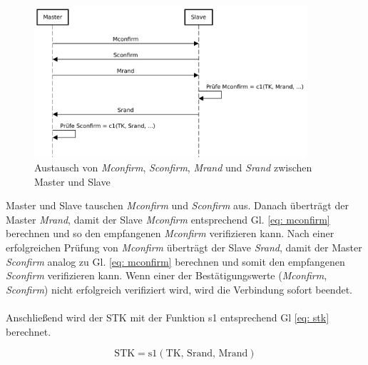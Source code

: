 \begin{figure}[H]
    \centering
    \includegraphics[width=0.9\textwidth]{graphics/austausch_vor_stk_generierung.pdf}
    \caption[Austausch von \textit{Mconfirm}, \textit{Sconfirm}, \textit{Mrand} und \textit{Srand} zwischen Master und Slave]{Austausch von \textit{Mconfirm}, \textit{Sconfirm}, \textit{Mrand} und \textit{Srand} zwischen Master und Slave}
    \label{fig: austausch vor stk generierung}
\end{figure}

Master und Slave tauschen \textit{Mconfirm} und \textit{Sconfirm} aus. Danach überträgt der Master \textit{Mrand}, damit der Slave \textit{Mconfirm} entsprechend Gl. \ref{eq: mconfirm} berechnen und so den empfangenen \textit{Mconfirm} verifizieren kann. Nach einer erfolgreichen Prüfung von \textit{Mconfirm} überträgt der Slave \textit{Srand}, damit der Master \textit{Sconfirm} analog zu Gl. \ref{eq: mconfirm} berechnen und somit den empfangenen \textit{Sconfirm} verifizieren kann. Wenn einer der Bestätigungswerte (\textit{Mconfirm}, \textit{Sconfirm}) nicht erfolgreich verifiziert wird, wird die Verbindung sofort beendet. \cite{BtSpec4.2_2305-2306}
\\\\
Anschließend wird der STK mit der Funktion s1 \cite{BtSpec4.2_2290} 
entsprechend Gl \ref{eq: stk} berechnet. \cite{BtSpec4.2_2305-2306}

\begin{equation}
    \text{STK} = \text{s1}(\text{TK, Srand, Mrand})
    \label{eq: stk}
\end{equation}

